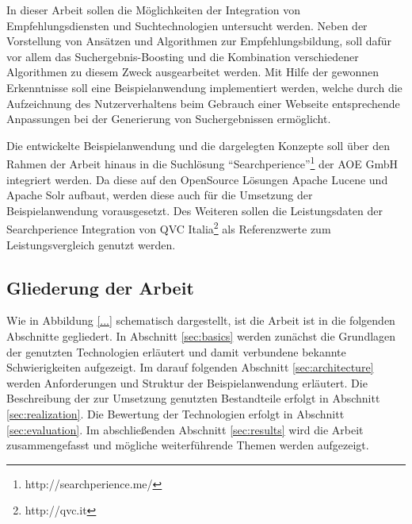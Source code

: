In dieser Arbeit sollen die Möglichkeiten der Integration von Empfehlungsdiensten und Suchtechnologien untersucht werden. Neben der Vorstellung von Ansätzen und Algorithmen zur Empfehlungsbildung, soll dafür vor allem das Suchergebnis-Boosting und die Kombination verschiedener Algorithmen zu diesem Zweck ausgearbeitet werden. Mit Hilfe der gewonnen Erkenntnisse soll eine Beispielanwendung implementiert werden, welche durch die Aufzeichnung des Nutzerverhaltens beim Gebrauch einer Webseite entsprechende Anpassungen bei der Generierung von Suchergebnissen ermöglicht.

Die entwickelte Beispielanwendung und die dargelegten Konzepte soll über den Rahmen der Arbeit hinaus in die Suchlösung ``Searchperience''\footnote{http://searchperience.me/} der AOE GmbH integriert werden. Da diese auf den OpenSource Lösungen Apache Lucene und Apache Solr aufbaut, werden diese auch für die Umsetzung der Beispielanwendung vorausgesetzt. Des Weiteren sollen die Leistungsdaten der Searchperience Integration von QVC Italia\footnote{http://qvc.it} als Referenzwerte zum Leistungsvergleich genutzt werden.

\subsection{Gliederung der Arbeit}

Wie in Abbildung \ref{...} schematisch dargestellt, ist die Arbeit ist in die folgenden Abschnitte gegliedert. In Abschnitt \ref{sec:basics} werden zunächst die Grundlagen der genutzten Technologien erläutert und damit verbundene bekannte Schwierigkeiten aufgezeigt. Im darauf folgenden Abschnitt \ref{sec:architecture} werden Anforderungen und Struktur der Beispielanwendung erläutert. Die Beschreibung der zur Umsetzung genutzten Bestandteile erfolgt in Abschnitt \ref{sec:realization}. Die Bewertung der Technologien erfolgt in Abschnitt \ref{sec:evaluation}. Im abschließenden Abschnitt \ref{sec:results} wird die Arbeit zusammengefasst und mögliche weiterführende Themen werden aufgezeigt.



